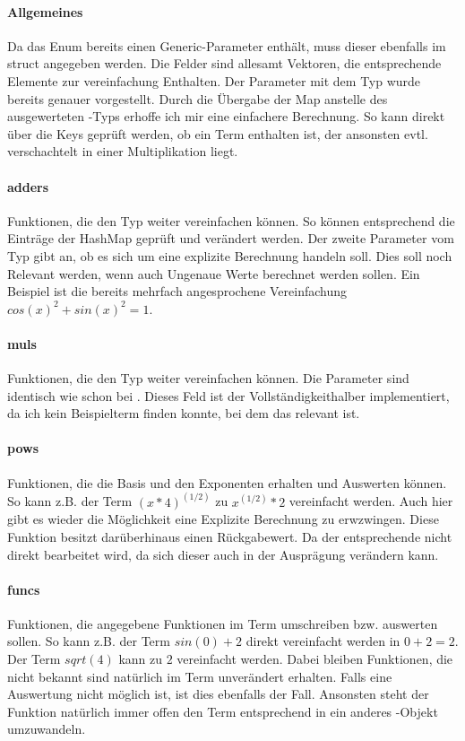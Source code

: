 \documentclass[11pt,a4paper, ngerman]{article}
\begin{document}
\paragraph{Allgemeines} Da das Enum  bereits einen Generic-Parameter enthält, muss dieser ebenfalls im struct angegeben werden. Die Felder sind allesamt Vektoren, die entsprechende Elemente zur vereinfachung Enthalten. Der Parameter mit dem Typ  wurde bereits genauer vorgestellt. Durch die Übergabe der Map anstelle des ausgewerteten -Typs erhoffe ich mir eine einfachere Berechnung. So kann direkt über die Keys geprüft werden, ob ein Term enthalten ist, der ansonsten evtl. verschachtelt in einer Multiplikation liegt.

\paragraph{adders} Funktionen, die den Typ  weiter vereinfachen können. So können entsprechend die Einträge der HashMap geprüft und verändert werden. Der zweite Parameter vom Typ  gibt an, ob es sich um eine explizite Berechnung handeln soll. Dies soll noch Relevant werden, wenn auch Ungenaue Werte berechnet werden sollen. Ein Beispiel ist die bereits mehrfach angesprochene Vereinfachung $cos(x)^2+sin(x)^2 = 1$.

\paragraph{muls} Funktionen, die den Typ  weiter vereinfachen können. Die Parameter sind identisch wie schon bei . Dieses Feld ist der Vollständigkeithalber implementiert, da ich kein Beispielterm finden konnte, bei dem das relevant ist.

\paragraph{pows} Funktionen, die die Basis und den Exponenten erhalten und Auswerten können. So kann z.B. der Term $(x*4)^{(1/2)}$ zu $x^{(1/2)}*2$ vereinfacht werden. Auch hier gibt es wieder die Möglichkeit eine Explizite Berechnung zu erwzwingen. Diese Funktion besitzt darüberhinaus einen Rückgabewert. Da der entsprechende  nicht direkt bearbeitet wird, da sich dieser auch in der Ausprägung verändern kann.

\paragraph{funcs} Funktionen, die angegebene Funktionen im Term umschreiben bzw. auswerten sollen. So kann z.B. der Term $sin(0) + 2$ direkt vereinfacht werden in $0 + 2 = 2$. Der Term $sqrt(4)$ kann zu $2$ vereinfacht werden. Dabei bleiben Funktionen, die  nicht bekannt sind natürlich im Term unverändert erhalten. Falls eine Auswertung nicht möglich ist, ist dies ebenfalls der Fall. Ansonsten steht der Funktion natürlich immer offen den Term entsprechend in ein anderes -Objekt umzuwandeln.
\end{document}
